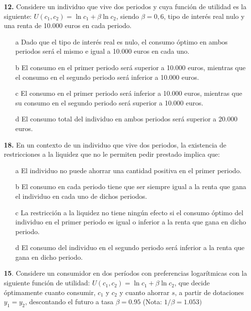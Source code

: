 \documentclass{nuevotema}
\begin{document}

\textbf{12.} Considere un individuo que vive dos periodos y cuya función de utilidad es la siguiente: $U(c_1, c_2) = \ln c_1 + \beta \ln c_2$, siendo $\beta = 0,6$, tipo de interés real nulo y una renta de 10.000 euros en cada periodo.

\begin{enumerate}
    \item[a] Dado que el tipo de interés real es nulo, el consumo óptimo en ambos periodos será el mismo e igual a 10.000 euros en cada uno.
    \item[b] El consumo en el primer periodo será superior a 10.000 euros, mientras que el consumo en el segundo periodo será inferior a 10.000 euros.
    \item[c] El consumo en el primer periodo será inferior a 10.000 euros, mientras que su consumo en el segundo periodo será superior a 10.000 euros.
    
    \item[d] El consumo total del individuo en ambos periodos será superior a 20.000 euros.
\end{enumerate}

\textbf{18.} En un contexto de un individuo que vive dos periodos, la existencia de restricciones a la liquidez que no le permiten pedir prestado implica que:

\begin{enumerate}
    \item[a] El individuo no puede ahorrar una cantidad positiva en el primer periodo.
    \item[b] El consumo en cada periodo tiene que ser siempre igual a la renta que gana el individuo en cada uno de dichos periodos.
    \item[c] La restricción a la liquidez no tiene ningún efecto si el consumo óptimo del individuo en el primer periodo es igual o inferior a la renta que gana en dicho periodo.
    \item[d] El consumo del individuo en el segundo periodo será inferior a la renta que gana en dicho periodo.
\end{enumerate}

\textbf{15}. Considere un consumidor en dos períodos con preferencias logarítmicas con la siguiente función de utilidad: $U(c_1, c_2) = \ln c_1 + \beta \ln c_2$, que decide óptimamente cuanto consumir, $c_1$ y $c_2$ y cuanto ahorrar $s$, a partir de dotaciones $y_1= y_2$, descontando el futuro a tasa $\beta = 0.95$ (Nota: $1/\beta = 1.053)$
\end{document}

